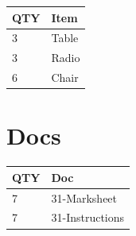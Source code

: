 \documentclass[10pt, A5]{article}
\begin{document}
\begin{framed}
\begin{minipage}{\textwidth}
\begin{multicols}{2}
		
	\begin{center}
			\begin{tabular}{p{2cm}p{4cm}}


				\textbf{QTY} & \textbf{Item} \\\toprule
												3&Table\\\midrule
												3&Radio\\\midrule
												6&Chair\\\midrule
								\end{tabular}

			\end{center}

		
		\vfill\null
		\columnbreak

			\section*{\faFile \: Docs}
		 	\begin{center}
			\begin{tabular}{p{2cm}p{4cm}}

			\textbf{QTY} & \textbf{Doc} \\\toprule
										7&31-Marksheet\\\midrule
										7&31-Instructions\\\midrule
							\end{tabular}
			\end{center}
	

		\vfill\null

		\end{multicols}
\end{minipage}
\end{framed}
\end{document}
